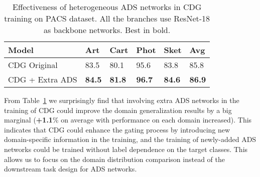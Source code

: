 \begin{table}[htb]
  \caption{Effectiveness of heterogeneous ADS networks in CDG training on PACS dataset. All the branches use ResNet-18 as backbone networks. Best in bold.}
  \label{tab:extra}
  \begin{center}
    \begin{tabularx}{0.5\textwidth}{p{}<{\centering}|X<{\centering}|X<{\centering}|X<{\centering}|X<{\centering}|X<{\centering}}

      \toprule[0.6pt]
      Model & Art & Cart & Phot & Sket & Avg           \\
      \midrule[0.4pt]

      CDG Original         & 83.5          & 80.1          & 95.6          & 83.8          & 85.8         \\
      CDG + Extra ADS      & \textbf{84.5}          &\textbf{81.8}          & \textbf{96.7}          & \textbf{84.6}          & \textbf{86.9}          \\

      \bottomrule[0.6pt]
    \end{tabularx}
  \end{center}
\end{table}

From Table~\ref{tab:extra} we surprisingly find that involving extra ADS networks in the training of CDG could improve the domain generalization results by a big marginal (\textbf{+1.1}\% on average with performance on each domain increased). This indicates that CDG could enhance the gating process by introducing new domain-specific information in the training, and the training of newly-added ADS networks could be trained without label dependence on the target classes. This allows us to focus on the domain distribution comparison instead of the downstream task design for ADS networks. 

